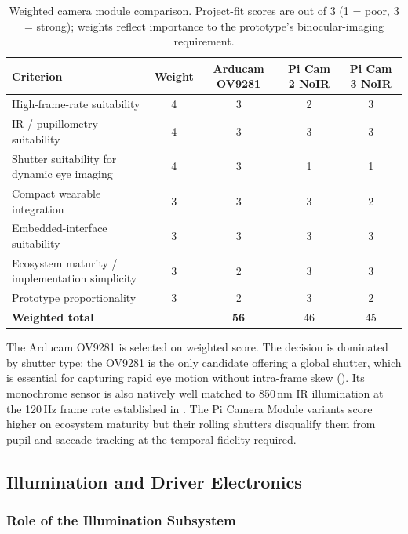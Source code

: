 \begin{table}[htbp]
    \centering
    \caption{Weighted camera module comparison. Project-fit scores are out of 3 (1 = poor, 3 = strong); weights reflect importance to the prototype's binocular-imaging requirement.}
    \label{tab:camera-comparison}
    \begin{tabular}{lcccc}
        \toprule
        \textbf{Criterion} & \textbf{Weight} & \textbf{Arducam OV9281} & \textbf{Pi Cam 2 NoIR} & \textbf{Pi Cam 3 NoIR} \\
        \midrule
        High-frame-rate suitability                 & 4 & 3 & 2 & 3 \\
        IR / pupillometry suitability               & 4 & 3 & 3 & 3 \\
        Shutter suitability for dynamic eye imaging & 4 & 3 & 1 & 1 \\
        Compact wearable integration                & 3 & 3 & 3 & 2 \\
        Embedded-interface suitability              & 3 & 3 & 3 & 3 \\
        Ecosystem maturity / implementation simplicity & 3 & 2 & 3 & 3 \\
        Prototype proportionality                   & 3 & 2 & 3 & 2 \\
        \midrule
        \textbf{Weighted total}                     &   & \textbf{56} & 46 & 45 \\
        \bottomrule
    \end{tabular}
\end{table}

The Arducam OV9281 is selected on weighted score. The decision is dominated by shutter type: the OV9281 is the only candidate offering a global shutter, which is essential for capturing rapid eye motion without intra-frame skew (). Its monochrome sensor is also natively well matched to 850\,nm IR illumination at the 120\,Hz frame rate established in . The Pi Camera Module variants score higher on ecosystem maturity but their rolling shutters disqualify them from pupil and saccade tracking at the temporal fidelity required.


\subsection{Illumination and Driver Electronics}

\subsubsection{Role of the Illumination Subsystem}

